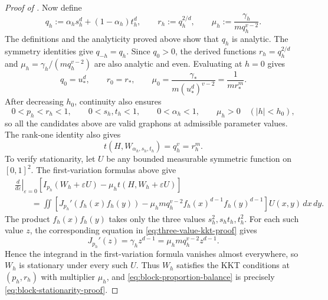 \begin{proof}[Proof of ]
Now define
\[
  q_h:=\alpha_hs_h^d+(1-\alpha_h)t_h^d,
  \qquad
  r_h:=q_h^{2/d},
  \qquad
  \mu_h:=\frac{\gamma_h}{m q_h^{v-2}}.
\]
The definitions and the analyticity proved above show that $q_h$ is analytic.
The symmetry identities give $q_{-h}=q_h$.  Since $q_0>0$, the derived
functions $r_h=q_h^{2/d}$ and $\mu_h=\gamma_h/(m q_h^{v-2})$ are also analytic
and even.  Evaluating at $h=0$ gives
\[
  q_0=u_*^d,
  \qquad
  r_0=r_*,
  \qquad
  \mu_0=\frac{\gamma_*}{m(u_*^d)^{v-2}}
  =\frac1{m r_*^m}.
\]
After decreasing $h_0$, continuity also ensures
\[
  0<p_h<r_h<1,\qquad 0<s_h,t_h<1,\qquad
  0<\alpha_h<1,\qquad \mu_h>0
  \quad (|h|<h_0),
\]
so all the candidates above are valid graphons at admissible parameter
values.
The rank-one identity also gives
\[
  t(H,W_{\alpha_h,s_h,t_h})=q_h^v=r_h^m.
\]
To verify stationarity, let $U$ be any bounded measurable symmetric function
on $[0,1]^2$.  The first-variation formulas above give
\[
\begin{aligned}
  &\left.\frac{d}{d\varepsilon}\right|_{\varepsilon=0}
  \left[I_{p_h}(W_h+\varepsilon U)
    -\mu_h t(H,W_h+\varepsilon U)\right]\\
  &\qquad=\iint\left[
    J_{p_h}'(f_h(x)f_h(y))
    -\mu_h m q_h^{v-2}f_h(x)^{d-1}f_h(y)^{d-1}
  \right]U(x,y)\,dx\,dy.
\end{aligned}
\]
The product $f_h(x)f_h(y)$ takes only the three values
$s_h^2,s_ht_h,t_h^2$.  For each such value $z$, the corresponding equation in
\eqref{eq:three-value-kkt-proof} gives
\[
  J_{p_h}'(z)=\gamma_hz^{d-1}
  =\mu_h m q_h^{v-2}z^{d-1}.
\]
Hence the integrand in the first-variation formula vanishes almost everywhere,
so $W_h$ is stationary under every such $U$.  Thus
$W_h$ satisfies the KKT conditions at $(p_h,r_h)$ with multiplier $\mu_h$, and
\eqref{eq:block-proportion-balance} is precisely
\eqref{eq:block-stationarity-proof}.


\end{proof}
